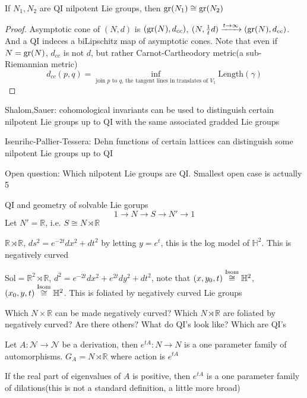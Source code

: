 \documentclass[main]{subfiles}
\begin{document}
\begin{theorem}[Pansu]
If $N_1,N_2$ are QI nilpotent Lie groups, then $\operatorname{gr}(N_1)\cong\operatorname{gr}(N_2)$
\end{theorem}

\begin{proof}
Asymptotic cone of $(N,d)$ is $(\operatorname{gr}(N),d_{cc})$, $(N,\frac{1}{t}d)\xrightarrow{t\to\infty}(\operatorname{gr}(N),d_{cc})$. And a QI indeces a biLipschitz map of asymptotic cones. Note that even if $N=\operatorname{gr}(N)$, $d_{cc}$ is not $d$, but rather Carnot-Cartheodory metric(a sub-Riemannian metric)
\[d_{cc}(p,q)=\inf_{\text{join }p\text{ to }q\text{, the tangent lines in translates of }V_1}\text{Length}(\gamma)\]
\end{proof}

Shalom,Sauer: cohomological invariants can be used to distinguish certain nilpotent Lie groups up to QI with the same associated gradded Lie groups

Isenrihc-Pallier-Tessera: Dehn functions of certain lattices can distinguish some nilpotent Lie groups up to QI

Open question: Which nilpotent Lie groups are QI. Smallest open case is actually 5

QI and geometry of solvable Lie gorups
\[1\to N\to S\to N'\to1\]
Let $N'=\mathbb R$, i.e. $S\cong N\rtimes\mathbb R$

\begin{example}
$\mathbb R\rtimes\mathbb R$, $ds^2=e^{-2t}dx^2+dt^2$ by letting $y=e^t$, this is the log model of $\mathbb H^2$. This is negatively curved

Sol$=\mathbb R^2\rtimes\mathbb R$, $d^2=e^{-2t}dx^2+e^{2t}dy^2+dt^2$, note that $(x,y_0,t)\overset{\operatorname{Isom}}{\cong}\mathbb H^2$, $(x_0,y,t)\overset{\operatorname{Isom}}{\cong}\mathbb H^2$. This is foliated by negatively curved Lie groups
\end{example}

\begin{question}
Which $N\times\mathbb R$ can be made negatively curved? Which $N\rtimes\mathbb R$ are foliated by negatively curved? Are there others? What do QI's look like? Which are QI's
\end{question}

Let $A:\mathscr N\to\mathscr N$ be a derivation, then $e^{tA}:N\to N$ is a one parameter family of automorphisms. $G_A=N\rtimes \mathbb R$ where action is $e^{tA}$

\begin{definition}
If the real part of eigenvalues of $A$ is positive, then $e^{tA}$ is a one parameter family of dilations(this is not a standard definition, a little more broad)
\end{definition}
\end{document}
